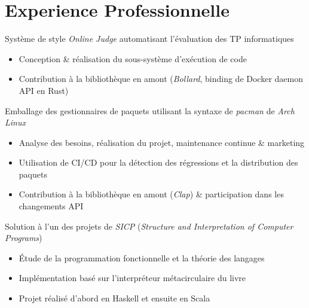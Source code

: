 \documentclass{resume}
\begin{document}
\section{Experience Professionnelle}
Système de style \textit{Online Judge} automatisant l'évaluation des TP informatiques
\begin{itemize}
  \item Conception \& réalisation du sous-système d'exécution de code
  \item Contribution à la bibliothèque en amont (\textit{Bollard}, binding de Docker daemon API en Rust)
\end{itemize}

Emballage des gestionnaires de paquets utilisant la syntaxe de \textit{pacman} de \textit{Arch Linux}
\begin{itemize}
  \item Analyse des besoins, réalisation du projet, maintenance continue \& marketing
  \item Utilisation de CI/CD pour la détection des régressions et la distribution des paquets
  \item Contribution à la bibliothèque en amont (\textit{Clap}) \& participation dans les changements API
\end{itemize}

Solution à l'un des projets de \textit{SICP} (\textit{Structure and Interpretation of Computer Programs})
\begin{itemize}
  \item Étude de la programmation fonctionnelle et la théorie des langages
  \item Implémentation basé sur l'interpréteur métacirculaire du livre
  \item Projet réalisé d'abord en Haskell et ensuite en Scala
\end{itemize}

\end{document}
